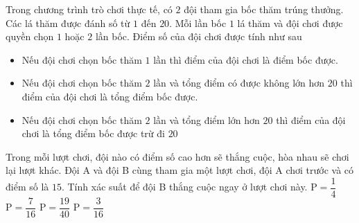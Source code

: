 \begin{ex}%
	Trong chương trình trò chơi thực tế, có $2$ đội tham gia bốc thăm trúng thưởng. Các lá thăm được đánh số từ $1$ đến $20.$ Mỗi lần bốc $1$ lá thăm và đội chơi được quyền chọn $1$ hoặc $2$ lần bốc. Điểm số của đội chơi được tính như sau
	\begin{itemize}
		\item Nếu đội chơi chọn bốc thăm $1$ lần thì điểm của đội chơi là điểm bốc được.
		\item Nếu đội chơi chọn bốc thăm $2$ lần và tổng điểm có được không lớn hơn $20$ thì điểm của đội chơi là tổng điểm bốc được.
		\item Nếu đội chơi chọn bốc thăm $2$ lần và tổng điểm lớn hơn $20$ thì điểm của đội chơi là tổng điểm bốc được trừ đi $20$
	\end{itemize}
	Trong mỗi lượt chơi, đội nào có điểm số cao hơn sẽ thắng cuộc, hòa nhau sẽ chơi lại lượt khác. Đội A và đội B cùng tham gia một lượt chơi, đội A chơi trước và có điểm số là $15$. Tính xác suất để đội B thắng cuộc ngay ở lượt chơi này.
	\choice
	{ $\mathrm{P}=\dfrac{1}{4}$}
	{\True $\mathrm{P}=\dfrac{7}{16}$}
	{ $\mathrm{P}=\dfrac{19}{40}$}
	{ $\mathrm{P}=\dfrac{3}{16}$}
\end{ex}
